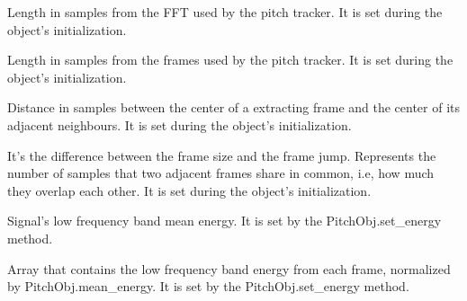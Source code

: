 \documentclass[letterpaper,10pt,english]{sphinxmanual}
\begin{document}
\begin{fulllineitems}
\label{pYAAPT:PitchObj.nfft}
Length in samples from the FFT used by the pitch tracker. It is set during the object's initialization.

\end{fulllineitems}


\begin{fulllineitems}
\label{pYAAPT:PitchObj.frame_size}
Length in samples from the frames used by the pitch tracker. It is set during the object's initialization.

\end{fulllineitems}


\begin{fulllineitems}
\label{pYAAPT:PitchObj.frame_jump}
Distance in samples between the center of a extracting frame and the center of its adjacent neighbours. It is set during the object's initialization.

\end{fulllineitems}


\begin{fulllineitems}
\label{pYAAPT:PitchObj.noverlap}
It's the difference between the frame size and the frame jump. Represents the number of samples that two adjacent frames share in common, i.e, how much they overlap each other. It is set during the object's initialization.

\end{fulllineitems}


\begin{fulllineitems}
\label{pYAAPT:PitchObj.mean_energy}
Signal's low frequency band mean energy. It is set by the PitchObj.set\_energy method.

\end{fulllineitems}


\begin{fulllineitems}
\label{pYAAPT:PitchObj.energy}
Array that contains the low frequency band energy from each frame, normalized by PitchObj.mean\_energy. It is set by the PitchObj.set\_energy method.

\end{fulllineitems}
\end{document}
